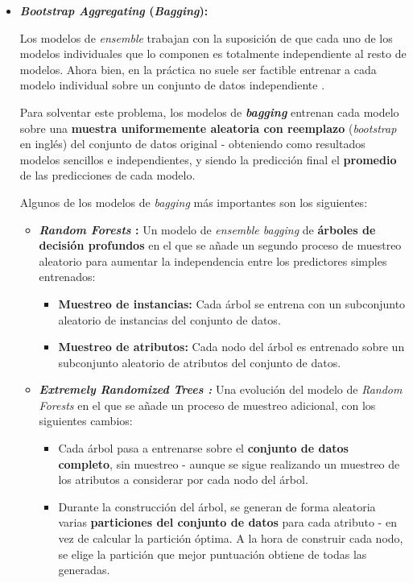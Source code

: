 \begin{itemize}[leftmargin=*, parsep=2pt, itemsep=2pt, topsep=4pt]

	\item \textbf{\textit{Bootstrap Aggregating} (\textit{Bagging}):} 
	
	Los modelos de \textit{ensemble} trabajan con la suposición de que cada uno de los modelos individuales que lo componen es totalmente independiente al resto de modelos. Ahora bien, en la práctica no suele ser factible entrenar a cada modelo individual sobre un conjunto de datos independiente \cite{baggingart}. 
	
	Para solventar este problema, los modelos de \textbf{\textit{bagging}} entrenan cada modelo sobre una \textbf{muestra uniformemente aleatoria con reemplazo} (\textit{bootstrap} en inglés) del conjunto de datos original \cite{baggingart} - obteniendo como resultados modelos sencillos e independientes, y siendo la predicción final el \textbf{promedio} de las predicciones de cada modelo.

	Algunos de los modelos de \textit{bagging} más importantes son los siguientes:
	
	\begin{itemize}[parsep=1pt, itemsep=1pt, topsep=4pt]
		\item \textbf{\textit{Random Forests} \cite{randomforests}:} Un modelo de \textit{ensemble bagging} de \textbf{árboles de decisión profundos} en el que se añade un segundo proceso de muestreo aleatorio para aumentar la independencia entre los predictores simples entrenados:
		\begin{itemize}
			\item \textbf{Muestreo de instancias:} Cada árbol se entrena con un subconjunto aleatorio de instancias del conjunto de datos.
			\item \textbf{Muestreo de atributos:} Cada nodo del árbol es entrenado sobre un subconjunto aleatorio de atributos del conjunto de datos.
		\end{itemize}
		\item \textbf{\textit{Extremely Randomized Trees \cite{Geurts2006}:}} Una evolución del modelo de \textit{Random Forests} en el que se añade un proceso de muestreo adicional, con los siguientes cambios:
		\begin{itemize}
			\item Cada árbol pasa a entrenarse sobre el \textbf{conjunto de datos completo}, sin muestreo - aunque se sigue realizando un muestreo de los atributos a considerar por cada nodo del árbol.
			\item Durante la construcción del árbol, se generan de forma aleatoria varias \textbf{particiones del conjunto de datos} para cada atributo - en vez de calcular la partición óptima. A la hora de construir cada nodo, se elige la partición que mejor puntuación obtiene de todas las generadas.
		\end{itemize}
	\end{itemize}
	

\end{itemize}
